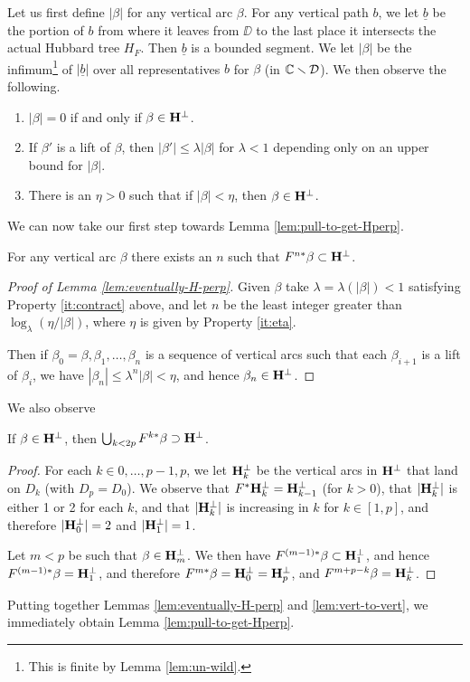 Let us first define $|\beta|$ for any vertical arc $\beta$.
For any vertical path $b$,
we let $\underline b$ be the portion of $b$ from where it leaves from $\DD$ to the last place it intersects the actual Hubbard tree $H_F$. 
Then $\underline b$ is a bounded segment. 
We let $|\beta|$ be the infimum\footnote{This is finite by Lemma \ref{lem:un-wild}.}
of $|\underline b|$ over all representatives $b$ for $\beta$ (in ${\Bbb C} \smallsetminus {\mathcal D}$).
We then observe the following.
\begin{enumerate}
\item
$|\beta|  = 0$ if and only if $\beta \in {\mathbf{H}}^\perp$.
\item \label{it:contract}
If $\beta'$ is a lift of $\beta$, then $|\beta'| \le \lambda |\beta|$ for $\lambda < 1$ depending only on an upper bound for $|\beta|$.
\item \label{it:eta}
There is an $\eta > 0$ such that if $|\beta| < \eta$, then $\beta \in {\mathbf{H}}^\perp$.
\end{enumerate}

We can now take our first step towards Lemma \ref{lem:pull-to-get-Hperp}. 
\begin{lem}\label{lem:eventually-H-perp}
For any vertical arc $\beta$ there exists an $n$ such that $F^{n*}\beta \subset {\mathbf{H}}^\perp$. 
\end{lem}

\begin{proof}[Proof of Lemma \ref{lem:eventually-H-perp}]
Given $\beta$
take $\lambda = \lambda(|\beta|) < 1$ satisfying Property \ref{it:contract} above, and
let $n$ be the least integer greater than $\log_\lambda(\eta/|\beta|)$, where $\eta$ is given by Property \ref{it:eta}. 

Then if $\beta_0 = \beta, \beta_1, \ldots, \beta_n$ is a sequence of vertical arcs such that each $\beta_{i+1}$ is a lift of $\beta_i$,
we have $|\beta_n| \le \lambda^n |\beta| < \eta$, and hence $\beta_n \in {\mathbf{H}}^\perp$. 
\end{proof}

We also observe
\begin{lemma} \label{lem:vert-to-vert}
If $\beta \in {\mathbf{H}}^\perp$,
then $\bigcup_{k < 2p} F^{k*}\beta \supset {\mathbf{H}}^\perp$.
\end{lemma}

\newcommand{\bhp}{\BH^\perp}
\begin{proof}
For each $k \in 0, \ldots, p-1, p$,
we let $\bhp_k$ be the vertical arcs in $\bhp$ that land on $D_k$ (with $D_p = D_0$).
We observe that $F^*\bhp_k = \bhp_{k-1}$ (for $k >0$),
that $|\bhp_k|$ is either 1 or 2 for each $k$, 
and that $|\bhp_k|$ is increasing in $k$ for $k \in [1, p]$,
and therefore $|\bhp_0| = 2$ and $|\bhp_1| = 1$.

Let $m < p$ be such that $\beta \in \bhp_m$.
We then have $F^{(m-1)*}\beta \subset \bhp_1$, 
and hence $F^{(m-1)*}\beta = \bhp_1$,
and therefore $F^{m*}\beta = \bhp_0= \bhp_p$, 
and $F^{m+p - k}\beta = \bhp_k$. 
\end{proof}

Putting together Lemmas \ref{lem:eventually-H-perp} and \ref{lem:vert-to-vert}, we immediately obtain Lemma \ref{lem:pull-to-get-Hperp}.





